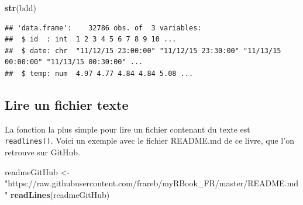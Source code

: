 \documentclass[]{book}
\newenvironment{Shaded}{\begin{snugshade}}{\end{snugshade}}
\newcommand{\KeywordTok}[1]{\textcolor[rgb]{0.13,0.29,0.53}{\textbf{#1}}}
\newcommand{\NormalTok}[1]{#1}
\newcommand{\StringTok}[1]{\textcolor[rgb]{0.31,0.60,0.02}{#1}}
\begin{document}
\begin{Shaded}
\begin{Highlighting}[]
\KeywordTok{str}\NormalTok{(bdd)}
\end{Highlighting}
\end{Shaded}

\begin{verbatim}
## 'data.frame':    32786 obs. of  3 variables:
##  $ id  : int  1 2 3 4 5 6 7 8 9 10 ...
##  $ date: chr  "11/12/15 23:00:00" "11/12/15 23:30:00" "11/13/15 00:00:00" "11/13/15 00:30:00" ...
##  $ temp: num  4.97 4.77 4.84 4.84 5.08 ...
\end{verbatim}

\hypertarget{l016readTXT}{%
\subsection{Lire un fichier texte}\label{l016readTXT}}

La fonction la plus simple pour lire un fichier contenant du texte est \texttt{readlines()}. Voici un exemple avec le fichier README.md de ce livre, que l'on retrouve sur GitHub.

\begin{Shaded}
\begin{Highlighting}[]
\NormalTok{readmeGitHub <-}\StringTok{ "https://raw.githubusercontent.com/frareb/myRBook_FR/master/README.md"}
\KeywordTok{readLines}\NormalTok{(readmeGitHub)}
\end{Highlighting}
\end{Shaded}
\end{document}
